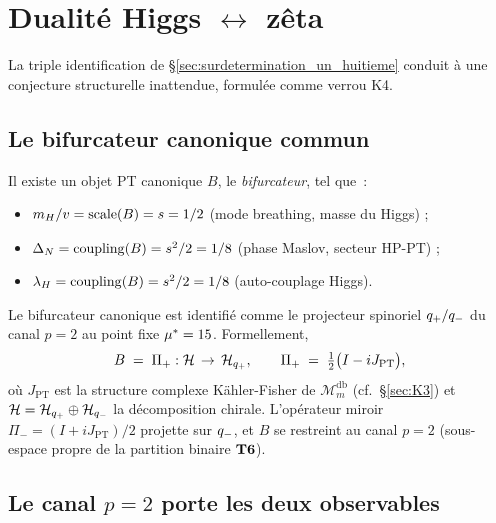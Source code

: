 \section{Dualité Higgs $\leftrightarrow$ zêta}
\label{sec:dualite_higgs_zeta}
\label{sec:dualite_higgs}

La triple identification de \S\ref{sec:surdetermination_un_huitieme}
conduit à une conjecture structurelle inattendue, formulée comme verrou
K4.

\subsection{Le bifurcateur canonique commun}
\label{sec:bifurcateur}

\begin{conjecture}
\label{conj:K4}
Il existe un objet PT canonique $B$, le \emph{bifurcateur}, tel que~:
\begin{itemize}[nosep,leftmargin=*]
\item $m_H / v = \mathrm{scale}(B) = s = 1/2$ (mode breathing, masse
  du Higgs) ;
\item $\Delta_N = \mathrm{coupling}(B) = s^{2}/2 = 1/8$ (phase
  Maslov, secteur HP-PT) ;
\item $\lambda_H = \mathrm{coupling}(B) = s^{2}/2 = 1/8$ (auto-couplage
  Higgs).
\end{itemize}
\end{conjecture}

Le bifurcateur canonique est identifié comme le projecteur spinoriel
$q_{+}/q_{-}$ du canal $p = 2$ au point fixe $\mu^{*} = 15$.
Formellement,
\begin{equation}
B \;=\; \Pi_+ : \mathcal{H} \,\to\, \mathcal{H}_{q_{+}}, \qquad
\Pi_+ \;=\; \tfrac{1}{2}\big(I - i J_{\mathrm{PT}}\big),
\label{eq:bifurcateur}
\end{equation}
où $J_{\mathrm{PT}}$ est la structure complexe Kähler-Fisher de
$\mathcal{M}_m^{\mathrm{db}}$ (cf.~\S\ref{sec:K3}) et $\mathcal{H} = \mathcal{H}_{q_{+}}
\oplus \mathcal{H}_{q_{-}}$ la décomposition chirale. L'opérateur miroir
$\Pi_- = (I + i J_{\mathrm{PT}})/2$ projette sur $q_{-}$, et $B$ se
restreint au canal $p = 2$ (sous-espace propre de la partition binaire
$\textbf{T6}$).

\subsection{Le canal $p = 2$ porte les deux observables}
\label{sec:canal_p2}

